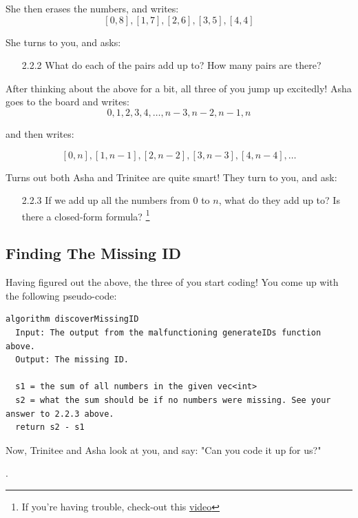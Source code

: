 \documentclass [12pt]{article}
\begin{document}
She then erases the numbers, and writes:
$$
[0, 8], [1, 7], [2, 6], [3, 5], [4, 4]
$$

She turns to you, and asks:

\begin{enumerate}
    \item [2.2.2]  What do each of the pairs add up to? How many pairs are there?
\end{enumerate}

After thinking about the above for a bit, all three of you jump up excitedly! Asha goes to the board and writes:
$$
0, 1, 2, 3, 4, \dots, n-3, n-2, n-1, n
$$

and then writes:

$$
[0, n], [1, n-1], [2, n-2], [3, n-3], [4, n-4], \dots
$$

Turns out both Asha and Trinitee are quite smart! They turn to you, and ask:

\begin{enumerate}
    \item [2.2.3]  If we add up all the numbers from $0$ to $n$, what do they add up to? Is there a closed-form formula? \footnote{If you're having trouble, check-out this \href{https://www.youtube.com/results?search_query=sum+of+first+n+terms}{video}}
\end{enumerate}



\subsection{Finding The Missing ID}
 Having figured out the above, the three of you start coding! You come up with the following pseudo-code:

\begin{verbatim}
algorithm discoverMissingID
  Input: The output from the malfunctioning generateIDs function above.
  Output: The missing ID.

  s1 = the sum of all numbers in the given vec<int>
  s2 = what the sum should be if no numbers were missing. See your answer to 2.2.3 above.
  return s2 - s1
\end{verbatim}

Now, Trinitee and Asha look at you, and say: "Can you code it up for us?"

.
\end{document}
